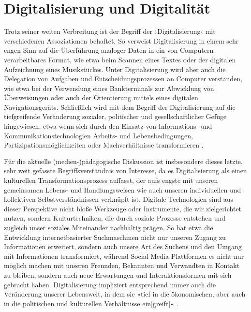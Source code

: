 \documentclass[
  a4paper,
]{book}
\begin{document}
\section{Digitalisierung und Digitalität}\label{digitalisierung-und-digitalituxe4t}

Trotz seiner weiten Verbreitung ist der Begriff der ›Digitalisierung‹ mit verschiedenen Assoziationen behaftet. So verweist Digitalisierung in einem sehr engen Sinn auf die Überführung analoger Daten in ein von Computern verarbeitbares Format, wie etwa beim Scannen eines Textes oder der digitalen Aufzeichnung eines Musikstückes. Unter Digitalisierung wird aber auch die Delegation von Aufgaben und Entscheidungsprozessen an Computer verstanden, wie etwa bei der Verwendung eines Bankterminals zur Abwicklung von Überweisungen oder auch der Orientierung mittels eines digitalen Navigationsgeräts. Schließlich wird mit dem Begriff der Digitalisierung auf die tiefgreifende Veränderung sozialer, politischer und gesellschaftlicher Gefüge hingewiesen, etwa wenn sich durch den Einsatz von Informations- und Kommunikationstechnologien Arbeits- und Lebensbedingungen, Partizipationsmöglichkeiten oder Machverhältnisse transformieren \citep{brindaFrankfurtDreieckZurBildung2019}.

Für die aktuelle (medien-)pädagogische Diskussion ist insbesondere dieses letzte, sehr weit gefasste Begriffsverständnis von Interesse, da es Digitalisierung als einen kulturellen Transformationsprozess auffasst, der aufs engste mit unseren gemeinsamen Lebens- und Handlungsweisen wie auch unseren individuellen und kollektiven Selbstverständnissen verknüpft ist. Digitale Technologien sind aus dieser Perspektive nicht bloße Werkzeuge oder Instrumente, die wir zielgerichtet nutzen, sondern Kulturtechniken, die durch soziale Prozesse entstehen und zugleich unser soziales Miteinander nachhaltig prägen. So hat etwa die Entwicklung internetbasierter Suchmaschinen nicht nur unseren Zugang zu Informationen erweitert, sondern auch unsere Art des Suchens und den Umgang mit Informationen transformiert, während Social Media Plattformen es nicht nur möglich machen mit unseren Freunden, Bekannten und Verwandten in Kontakt zu bleiben, sondern auch neue Erwartungen und Interaktionsformen mit sich gebracht haben. Digitalisierung impliziert entsprechend immer auch die Veränderung unserer Lebenswelt, in dem sie »tief in die ökonomischen, aber auch in die politischen und kulturellen Verhältnisse ein{[}greift{]}« \citep[S. 33]{coyKulturenNichtBetreten2008}.
\end{document}
